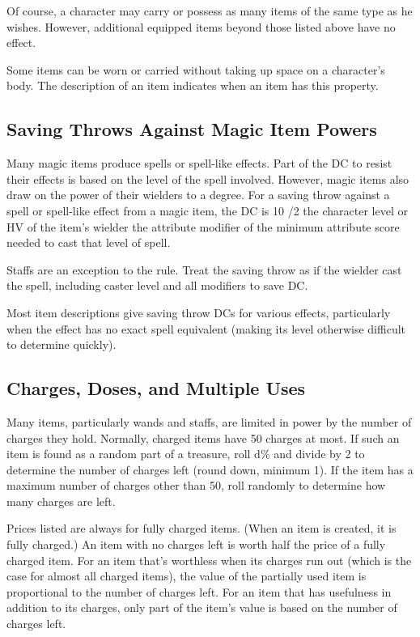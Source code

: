 Of course, a character may carry or possess as many items of the same type as he wishes. However, additional equipped items beyond those listed above have no effect.

Some items can be worn or carried without taking up space on a character's body. The description of an item indicates when an item has this property.

\subsection{Saving Throws Against Magic Item Powers}

Many magic items produce spells or spell-like effects. Part of the DC to resist their effects is based on the level of the spell involved. However, magic items also draw on the power of their wielders to a degree. For a saving throw against a spell or spell-like effect from a magic item, the DC is 10 /2 the character level or HV of the item's wielder \add the attribute modifier of the minimum attribute score needed to cast that level of spell.

Staffs are an exception to the rule. Treat the saving throw as if the wielder cast the spell, including caster level and all modifiers to save DC.

Most item descriptions give saving throw DCs for various effects, particularly when the effect has no exact spell equivalent (making its level otherwise difficult to determine quickly).

\subsection{Charges, Doses, and Multiple Uses}

Many items, particularly wands and staffs, are limited in power by the number of charges they hold. Normally, charged items have 50 charges at most. If such an item is found as a random part of a treasure, roll d\% and divide by 2 to determine the number of charges left (round down, minimum 1). If the item has a maximum number of charges other than 50, roll randomly to determine how many charges are left.

Prices listed are always for fully charged items. (When an item is created, it is fully charged.) An item with no charges left is worth half the price of a fully charged item. For an item that's worthless when its charges run out (which is the case for almost all charged items), the value of the partially used item is proportional to the number of charges left. For an item that has usefulness in addition to its charges, only part of the item's value is based on the number of charges left.

